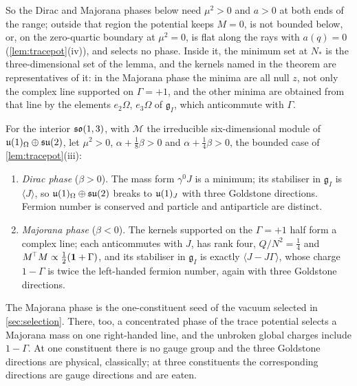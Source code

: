So the Dirac and Majorana phases below need $\mu^2>0$ and $a>0$ at both ends of the range; outside that region the potential keeps
$M=0$, is not bounded below, or, on the zero-quartic boundary at $\mu^2=0$, is flat along the rays with $a(q)=0$ (\cref{lem:tracepot}(iv)), and selects no phase. Inside it, the minimum set at $N_*$ is the three-dimensional set of the lemma, and the kernels named in the theorem are representatives of it: in the
Majorana phase the minima are all null $z$, not only the complex line supported on $\Gamma=+1$, and the other minima are obtained from that line by the
elements $e_2\Omega$, $e_3\Omega$ of $\mathfrak g_I$, which anticommute with $\Gamma$.

\begin{theorem}
\label{thm:twophases}
For the interior $\mathfrak{so}(1,3)$, with $\mathcal M$ the irreducible six-dimensional module of $\mathfrak{u}(1)_\Omega\oplus\mathfrak{su}(2)$, let $\mu^2>0$, $\alpha+\tfrac18\beta>0$ and
$\alpha+\tfrac14\beta>0$, the bounded case of \cref{lem:tracepot}(iii):
\begin{enumerate}[label=(\alph*),leftmargin=2.2em]
\item \emph{Dirac phase} ($\beta>0$). The mass form $\gamma^0J$ is a minimum; its stabiliser in $\mathfrak g_I$ is $\langle J\rangle$, so
$\mathfrak{u}(1)_\Omega\oplus\mathfrak{su}(2)$ breaks to $\mathfrak{u}(1)_J$ with three Goldstone directions. Fermion number is conserved and particle and antiparticle are
distinct.
\item \emph{Majorana phase} ($\beta<0$). The kernels supported on the $\Gamma=+1$ half form a complex line; each anticommutes with $J$, has
rank four, $Q/N^2=\tfrac14$ and $M^{\!\top}M\propto\tfrac12(\mathbf 1+\Gamma)$, and its stabiliser in $\mathfrak g_I$ is exactly $\langle J-J\Gamma\rangle$,
whose charge $1-\Gamma$ is twice the left-handed fermion number, again with three Goldstone directions.
\end{enumerate}
\end{theorem}

The Majorana phase is the one-constituent seed of the vacuum selected in \cref{sec:selection}. There, too, a concentrated phase of the
trace potential selects a Majorana mass on one right-handed line, and the unbroken global charges include $1-\Gamma$. At one constituent there
is no gauge group and the three Goldstone directions are physical, classically; at three constituents the corresponding directions are gauge
directions and are eaten.

